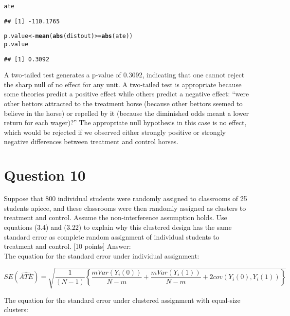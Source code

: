 \documentclass[11pt,notitlepage]{article}\usepackage[]{graphicx}\usepackage[]{color}
\makeatletter
\newcommand{\hlopt}[1]{\textcolor[rgb]{0,0,0}{#1}}%
\newcommand{\hlstd}[1]{\textcolor[rgb]{0.345,0.345,0.345}{#1}}%
\newcommand{\hlkwb}[1]{\textcolor[rgb]{0.69,0.353,0.396}{#1}}%
\newcommand{\hlkwd}[1]{\textcolor[rgb]{0.737,0.353,0.396}{\textbf{#1}}}%
\newenvironment{kframe}{%
 \def\at@end@of@kframe{}%
 \ifinner\ifhmode%
  \def\at@end@of@kframe{\end{minipage}}%
  \begin{minipage}{\columnwidth}%
 \fi\fi%
 \def\FrameCommand##1{\hskip\@totalleftmargin \hskip-\fboxsep
 \colorbox{shadecolor}{##1}\hskip-\fboxsep
     \hskip-\linewidth \hskip-\@totalleftmargin \hskip\columnwidth}%
 \MakeFramed {\advance\hsize-\width
   \@totalleftmargin\z@ \linewidth\hsize
   \@setminipage}}%
 {\par\unskip\endMakeFramed%
 \at@end@of@kframe}
\newenvironment{knitrout}{}{} %
\makeatother
\begin{document}
\begin{enumerate}[a)]
\begin{knitrout}
\begin{kframe}
\begin{alltt}
\hlstd{ate}
\end{alltt}
\begin{verbatim}
## [1] -110.1765
\end{verbatim}
\begin{alltt}
\hlstd{p.value} \hlkwb{<-} \hlkwd{mean}\hlstd{(}\hlkwd{abs}\hlstd{(distout)} \hlopt{>=} \hlkwd{abs}\hlstd{(ate))}
\hlstd{p.value}
\end{alltt}
\begin{verbatim}
## [1] 0.3092
\end{verbatim}
\end{kframe}
\end{knitrout}
A two-tailed test generates a p-value of 0.3092, indicating that one cannot reject the sharp null of no effect for any unit. A two-tailed test is appropriate because some theories predict a positive effect while others predict a negative effect: ``were other bettors attracted to the treatment horse (because other bettors seemed to believe in the horse) or repelled by it (because the diminished odds meant a lower return for each wager)?''  The appropriate null hypothesis in this case is no effect, which would be rejected if we observed either strongly positive or strongly negative differences between treatment and control horses.
\end{enumerate}

\section*{Question 10}
Suppose that 800 individual students were randomly assigned to classrooms of 25 students apiece, and these classrooms were then randomly assigned as clusters to treatment and control. Assume the non-interference assumption holds. Use equations (3.4) and (3.22) to explain why this clustered design has the same standard error as complete random assignment of individual students to treatment and control. [10 points]
Answer:\\

The equation for the standard error under individual assignment:

\begin{equation*}
SE(\widehat{ATE}) = \sqrt{\frac{1}{(N-1)} \left \{ \frac{mVar(Y_i (0))}{N- m} + \frac{mVar(Y_i (1))}{N- m} + 2cov(Y_i(0), Y_i(1))\right \}}
\end{equation*}

The equation for the standard error under clustered assignment with equal-size clusters:
\end{document}
